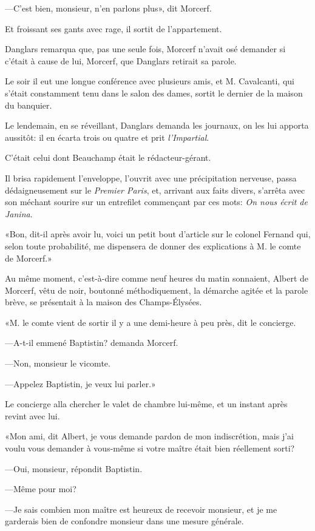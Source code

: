 —C'est bien, monsieur, n'en parlons plus», dit Morcerf. 

Et froissant ses gants avec rage, il sortit de l'appartement. 

Danglars remarqua que, pas une seule fois, Morcerf n'avait osé demander si c'était à cause de lui, Morcerf, que Danglars retirait sa parole. 

Le soir il eut une longue conférence avec plusieurs amis, et M. Cavalcanti, qui s'était constamment tenu dans le salon des dames, sortit le dernier de la maison du banquier. 

Le lendemain, en se réveillant, Danglars demanda les journaux, on les lui apporta aussitôt: il en écarta trois ou quatre et prit \textit{l'Impartial}. 

C'était celui dont Beauchamp était le rédacteur-gérant. 

Il brisa rapidement l'enveloppe, l'ouvrit avec une précipitation nerveuse, passa dédaigneusement sur le \textit{Premier Paris}, et, arrivant aux faits divers, s'arrêta avec son méchant sourire sur un entrefilet commençant par ces mots: \textit{On nous écrit de Janina}. 

«Bon, dit-il après avoir lu, voici un petit bout d'article sur le colonel Fernand qui, selon toute probabilité, me dispensera de donner des explications à M. le comte de Morcerf.» 

Au même moment, c'est-à-dire comme neuf heures du matin sonnaient, Albert de Morcerf, vêtu de noir, boutonné méthodiquement, la démarche agitée et la parole brève, se présentait à la maison des Champs-Élysées. 

«M. le comte vient de sortir il y a une demi-heure à peu près, dit le concierge. 

—A-t-il emmené Baptistin? demanda Morcerf. 

—Non, monsieur le vicomte. 

—Appelez Baptistin, je veux lui parler.» 

Le concierge alla chercher le valet de chambre lui-même, et un instant après revint avec lui. 

«Mon ami, dit Albert, je vous demande pardon de mon indiscrétion, mais j'ai voulu vous demander à vous-même si votre maître était bien réellement sorti? 

—Oui, monsieur, répondit Baptistin. 

—Même pour moi? 

—Je sais combien mon maître est heureux de recevoir monsieur, et je me garderais bien de confondre monsieur dans une mesure générale.  

